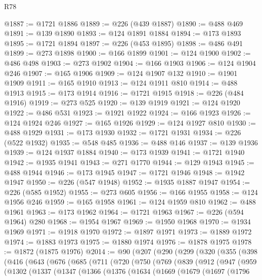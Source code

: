 \begin{lexlean}{R78}
\begin{coremodule}
@1887 := @1721 @1886
@1889 := @226 (@439 @1887)
@1890 := @488 @469
@1891 := @139 @1890
@1893 := @124 @1891 @1884
@1894 := @173 @1893
@1895 := @1721 @1894
@1897 := @226 (@453 @1895)
@1898 := @486 @491
@1899 := @273 @1898
@1900 := @166 @1899
@1901 := @124 @1900
@1902 := @486 @498
@1903 := @273 @1902
@1904 := @166 @1903
@1906 := @124 @1904 @246
@1907 := @165 @1906
@1909 := @124 @1907 @132
@1910 := @1901 @1909
@1911 := @165 @1910
@1913 := @124 @1911 @810
@1914 := @488 @1913
@1915 := @173 @1914
@1916 := @1721 @1915
@1918 := @226 (@484 @1916)
@1919 := @273 @525
@1920 := @139 @1919
@1921 := @124 @1920
@1922 := @486 @531
@1923 := @1921 @1922
@1924 := @166 @1923
@1926 := @124 @1924 @246
@1927 := @165 @1926
@1929 := @124 @1927 @810
@1930 := @488 @1929
@1931 := @173 @1930
@1932 := @1721 @1931
@1934 := @226 (@522 @1932)
@1935 := @548 @485
@1936 := @488 @146
@1937 := @139 @1936
@1939 := @124 @1937 @1884
@1940 := @173 @1939
@1941 := @1721 @1940
@1942 := @1935 @1941
@1943 := @271 @1770
@1944 := @129 @1943
@1945 := @488 @1944
@1946 := @173 @1945
@1947 := @1721 @1946
@1948 := @1942 @1947
@1950 := @226 (@547 @1948)
@1952 := @1935 @1887 @1947
@1954 := @226 (@585 @1952)
@1955 := @273 @605
@1956 := @166 @1955
@1958 := @124 @1956 @246
@1959 := @165 @1958
@1961 := @124 @1959 @810
@1962 := @488 @1961
@1963 := @173 @1962
@1964 := @1721 @1963
@1967 := @226 (@594 @1964) @280
@1968 := @1954 @1967
@1969 := @1950 @1968
@1970 := @1934 @1969
@1971 := @1918 @1970
@1972 := @1897 @1971
@1973 := @1889 @1972
@1974 := @1883 @1973
@1975 := @1880 @1974
@1976 := @1878 @1975
@1978 := @1872 (@1875 @1976)
@2014 := @90
    (@207
      (@290
        (@299
          (@320
            (@355
              (@398
                (@416
                  (@643
                    (@676
                      (@685
                        (@711
                          (@720
                            (@750
                              (@769
                                (@839
                                  (@912
                                    (@947
                                      (@959
                                        (@1302
                                          (@1337
                                            (@1347
                                              (@1366
                                                (@1376
                                                  (@1634
                                                    (@1669
                                                      (@1679
                                                        (@1697
                                                          (@1796

\end{coremodule}
\end{lexlean}
